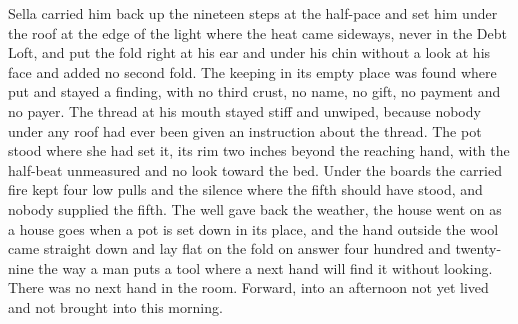 Sella carried him back up the nineteen steps at the half-pace and set him under the roof at the edge of the light where the heat came sideways, never in the Debt Loft, and put the fold right at his ear and under his chin without a look at his face and added no second fold. The keeping in its empty place was found where put and stayed a finding, with no third crust, no name, no gift, no payment and no payer. The thread at his mouth stayed stiff and unwiped, because nobody under any roof had ever been given an instruction about the thread. The pot stood where she had set it, its rim two inches beyond the reaching hand, with the half-beat unmeasured and no look toward the bed. Under the boards the carried fire kept four low pulls and the silence where the fifth should have stood, and nobody supplied the fifth. The well gave back the weather, the house went on as a house goes when a pot is set down in its place, and the hand outside the wool came straight down and lay flat on the fold on answer four hundred and twenty-nine the way a man puts a tool where a next hand will find it without looking. There was no next hand in the room. Forward, into an afternoon not yet lived and not brought into this morning.

